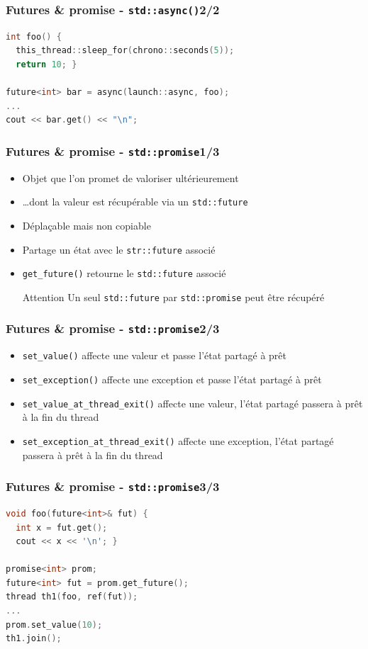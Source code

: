 \documentclass[C++.tex]{subfiles}
\begin{document}
\begin{frame}[fragile]
	\frametitle{Futures \& promise - \lstinline|std::async()|\titlehfill{}2/2}
	\begin{lstlisting}[language=C++]
int foo() {
  this_thread::sleep_for(chrono::seconds(5));
  return 10; }

future<int> bar = async(launch::async, foo);
...
cout << bar.get() << "\n";\end{lstlisting}
\end{frame}

\begin{frame}[fragile]
	\frametitle{Futures \& promise - \lstinline|std::promise|\titlehfill{}1/3}
	\begin{itemize}
		\item Objet que l'on promet de valoriser ultérieurement
		\item \ldots{}dont la valeur est récupérable via un \lstinline|std::future|
		\item Déplaçable mais non copiable
		\item Partage un état avec le \lstinline|str::future| associé
		\item \lstinline|get_future()| retourne le \lstinline|std::future| associé

		\begin{alertblock}{Attention}
			Un seul \lstinline|std::future| par \lstinline|std::promise| peut être récupéré
		\end{alertblock}
	\end{itemize}
\end{frame}

\begin{frame}[fragile]
	\frametitle{Futures \& promise - \lstinline|std::promise|\titlehfill{}2/3}
	\begin{itemize}
		\item \lstinline|set_value()| affecte une valeur et passe l'état partagé à prêt
		\item \lstinline|set_exception()| affecte une exception et passe l'état partagé à prêt
		\item \lstinline|set_value_at_thread_exit()| affecte une valeur, l'état partagé passera à prêt à la fin du thread
		\item \lstinline|set_exception_at_thread_exit()| affecte une exception, l'état partagé passera à prêt à la fin du thread
	\end{itemize}
\end{frame}

\begin{frame}[fragile]
	\frametitle{Futures \& promise - \lstinline|std::promise|\titlehfill{}3/3}
	\begin{lstlisting}[language=C++]
void foo(future<int>& fut) {
  int x = fut.get();
  cout << x << '\n'; }

promise<int> prom;
future<int> fut = prom.get_future();
thread th1(foo, ref(fut));
...
prom.set_value(10);
th1.join();\end{lstlisting}
\end{frame}
\end{document}
